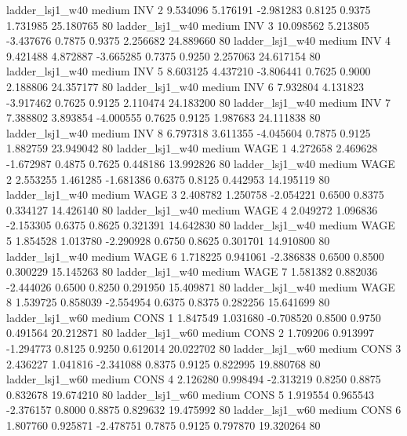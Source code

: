        ladder_lsj1_w40     medium      INV                 2  9.534096 5.176191 -2.981283 0.8125 0.9375  1.731985   25.180765 80
       ladder_lsj1_w40     medium      INV                 3 10.098562 5.213805 -3.437676 0.7875 0.9375  2.256682   24.889660 80
       ladder_lsj1_w40     medium      INV                 4  9.421488 4.872887 -3.665285 0.7375 0.9250  2.257063   24.617154 80
       ladder_lsj1_w40     medium      INV                 5  8.603125 4.437210 -3.806441 0.7625 0.9000  2.188806   24.357177 80
       ladder_lsj1_w40     medium      INV                 6  7.932804 4.131823 -3.917462 0.7625 0.9125  2.110474   24.183200 80
       ladder_lsj1_w40     medium      INV                 7  7.388802 3.893854 -4.000555 0.7625 0.9125  1.987683   24.111838 80
       ladder_lsj1_w40     medium      INV                 8  6.797318 3.611355 -4.045604 0.7875 0.9125  1.882759   23.949042 80
       ladder_lsj1_w40     medium     WAGE                 1  4.272658 2.469628 -1.672987 0.4875 0.7625  0.448186   13.992826 80
       ladder_lsj1_w40     medium     WAGE                 2  2.553255 1.461285 -1.681386 0.6375 0.8125  0.442953   14.195119 80
       ladder_lsj1_w40     medium     WAGE                 3  2.408782 1.250758 -2.054221 0.6500 0.8375  0.334127   14.426140 80
       ladder_lsj1_w40     medium     WAGE                 4  2.049272 1.096836 -2.153305 0.6375 0.8625  0.321391   14.642830 80
       ladder_lsj1_w40     medium     WAGE                 5  1.854528 1.013780 -2.290928 0.6750 0.8625  0.301701   14.910800 80
       ladder_lsj1_w40     medium     WAGE                 6  1.718225 0.941061 -2.386838 0.6500 0.8500  0.300229   15.145263 80
       ladder_lsj1_w40     medium     WAGE                 7  1.581382 0.882036 -2.444026 0.6500 0.8250  0.291950   15.409871 80
       ladder_lsj1_w40     medium     WAGE                 8  1.539725 0.858039 -2.554954 0.6375 0.8375  0.282256   15.641699 80
       ladder_lsj1_w60     medium     CONS                 1  1.847549 1.031680 -0.708520 0.8500 0.9750  0.491564   20.212871 80
       ladder_lsj1_w60     medium     CONS                 2  1.709206 0.913997 -1.294773 0.8125 0.9250  0.612014   20.022702 80
       ladder_lsj1_w60     medium     CONS                 3  2.436227 1.041816 -2.341088 0.8375 0.9125  0.822995   19.880768 80
       ladder_lsj1_w60     medium     CONS                 4  2.126280 0.998494 -2.313219 0.8250 0.8875  0.832678   19.674210 80
       ladder_lsj1_w60     medium     CONS                 5  1.919554 0.965543 -2.376157 0.8000 0.8875  0.829632   19.475992 80
       ladder_lsj1_w60     medium     CONS                 6  1.807760 0.925871 -2.478751 0.7875 0.9125  0.797870   19.320264 80
